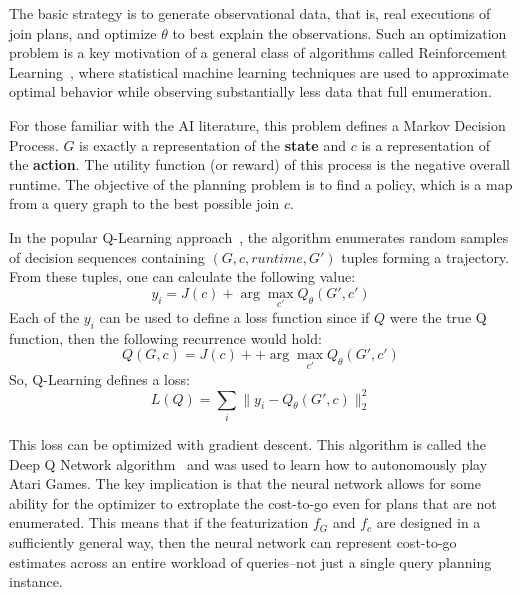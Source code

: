 The basic strategy  is to generate observational data, that is, real executions of join plans, and optimize $\theta$ to best explain the observations. Such an optimization problem is a key motivation of a general class of algorithms called Reinforcement Learning~\cite{sutton1998reinforcement}, where statistical machine learning techniques are used to approximate optimal behavior while observing substantially less data that full enumeration. 

For those familiar with the AI literature, this problem defines a Markov Decision Process. $G$ is exactly a representation of the \textbf{state} and $c$ is a representation of the \textbf{action}.
The utility function (or reward) of this process is the negative overall runtime.
The objective of the planning problem is to find a policy, which is a map from a query graph to the best possible join $c$.

In the popular Q-Learning approach~\cite{sutton1998reinforcement}, the algorithm enumerates random samples of decision sequences containing $(G,c, runtime, G')$ tuples forming a trajectory. From these tuples, one can calculate the following value:
\[
y_i = J(c) + \arg \max_{c'} Q_\theta(G',c')
\]
Each of the $y_i$ can be used to define a loss function since if $Q$ were the true Q function, then the following recurrence would hold:
\[
Q(G,c) = J(c) + + \arg \max_{c'} Q_\theta(G',c')
\]
So, Q-Learning defines a loss:
\[
L(Q) = \sum_{i} \|y_i - Q_\theta(G',c)\|_2^2
\]

This loss can be optimized with gradient descent. 
This algorithm is called the Deep Q Network algorithm~\cite{mnih2015human} and was used to learn how to autonomously play Atari Games.
The key implication is that the neural network allows for some ability for the optimizer to extroplate the cost-to-go even for plans that are not enumerated. This means that if the featurization $f_G$ and $f_c$ are designed in a sufficiently general way, then the neural network can represent cost-to-go estimates across an entire workload of queries--not just a single query planning instance.
